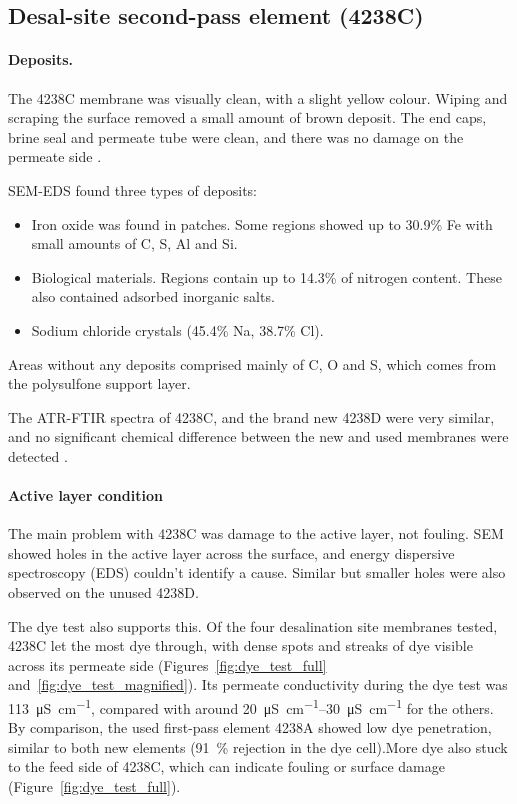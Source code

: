 \subsection{Desal-site second-pass element (4238C)}
\label{sec:res-fouling-4238C}

\paragraph{Deposits.} 
The 4238C membrane was visually clean, with a slight yellow colour. Wiping and scraping the surface removed a small amount of brown deposit. The end caps, brine seal and permeate tube were clean, and there was no damage on the permeate side \citep{MembraneWorks2025Desal}. 

SEM-EDS found three types of deposits:
\begin{itemize}
  \item Iron oxide was found in patches. Some regions showed up to 30.9\% Fe with small amounts of C, S, Al and Si. 
  \item Biological materials. Regions contain up to 14.3\% of nitrogen content. These also contained adsorbed inorganic salts.
  \item Sodium chloride crystals (45.4\% Na, 38.7\% Cl).
\end{itemize}
Areas without any deposits comprised mainly of C, O and S, which comes from the polysulfone support layer. 

The ATR-FTIR spectra of 4238C, and the brand new 4238D were very similar, and no significant chemical difference between the new and used membranes were detected \citep{MembraneWorks2025Desal}. 

\paragraph{Active layer condition}
The main problem with 4238C was damage to the active layer, not fouling. SEM showed holes in the active layer across the surface, and energy dispersive spectroscopy (EDS) couldn't identify a cause. Similar but smaller holes were also observed on the unused 4238D.

The dye test also supports this. Of the four desalination site membranes tested, 4238C let the most dye through, with dense spots and streaks of dye visible across its permeate side (Figures~\ref{fig:dye_test_full} and~\ref{fig:dye_test_magnified}). Its permeate conductivity during the dye test was \qty{113}{\micro\siemens\per\centi\metre}, compared with around \qtyrange{20}{30}{\micro\siemens\per\centi\metre} for the others. By comparison, the used first-pass element 4238A showed low dye penetration, similar to both new elements (\qty{91}{\percent} rejection in the dye cell).More dye also stuck to the feed side of 4238C, which can indicate fouling or surface damage (Figure~\ref{fig:dye_test_full}).

